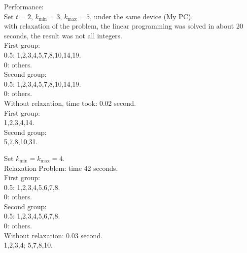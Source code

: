 \documentclass[xcolor=dvipsnames]{beamer}
\begin{document}
\begin{frame}
Performance:\\
Set $t=2$, $k_{\min}=3$, $k_{\max}=5$, under the same device (My PC),\\
with relaxation of the problem, the linear programming was solved in about 20 seconds, the result was not all integers.\\
First group:\\
0.5: 1,2,3,4,5,7,8,10,14,19.\\
0: others.\\
Second group:\\
0.5: 1,2,3,4,5,7,8,10,14,19.\\
0: others.\\
Without relaxation, time took: 0.02 second.\\
First group:\\
1,2,3,4,14.\\
Second group:\\
5,7,8,10,31.\\
\end{frame}
\begin{frame}
Set $k_{\min}=k_{\max}=4$.\\
Relaxation Problem: time 42 seconds.\\
First group:\\
0.5: 1,2,3,4,5,6,7,8.\\
0: others.\\
Second group:\\
0.5: 1,2,3,4,5,6,7,8.\\
0: others.\\
Without relaxation: 0.03 second.\\
1,2,3,4; 5,7,8,10.\\
\end{frame}
\end{document}

